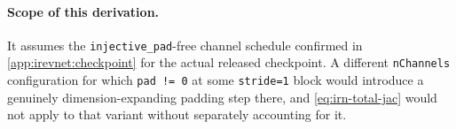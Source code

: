\paragraph{Scope of this derivation.} It assumes the \texttt{injective\_pad}-free channel schedule 
confirmed
in \cref{app:irevnet:checkpoint} for the actual released checkpoint. A different \texttt{nChannels}
configuration for which \texttt{pad != 0} at some \texttt{stride=1} block would introduce a genuinely
dimension-expanding padding step there, and \cref{eq:irn-total-jac} would not apply to that variant 
without separately accounting for it.

